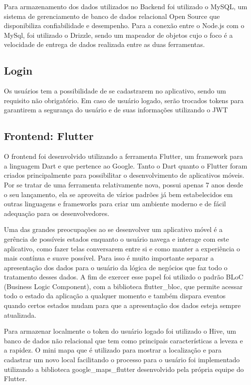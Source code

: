 \documentclass[12pt]{article}
\begin{document}
Para armazenamento dos dados utilizados no Backend foi utilizado o MySQL, um sistema de gerenciamento de banco de dados relacional Open Source que disponibiliza confiabilidade e desempenho. Para a conexão entre o Node.js com o MySql, foi utilizado o Drizzle, sendo um mapeador de objetos cujo o foco é a velocidade de entrega de dados realizada entre as duas ferramentas.

\subsection{Login}
Os usuários tem a possibilidade de se cadastrarem no aplicativo, sendo um requisito não obrigatório. Em caso de usuário logado, serão trocados tokens para garantirem a segurança do usuário e de suas informações utilizando o JWT

\subsection{Frontend: Flutter}
O frontend foi desenvolvido utilizando a ferramenta Flutter, um framework para a linguagem Dart e que pertence ao Google. Tanto o Dart quanto o Flutter foram criados principalmente para possibilitar o desenvolvimento de aplicativos móveis. Por se tratar de uma ferramenta relativamente nova, possui apenas 7 anos desde o seu lançamento, ela se aproveita de vários padrões já bem estabelecidos em outras linguagens e frameworks para criar um ambiente moderno e de fácil adequação para os desenvolvedores.

Uma das grandes preocupações ao se desenvolver um aplicativo móvel é a gerência de possíveis estados enquanto o usuário navega e interage com este aplicativo, como fazer telas conversarem entre si e como manter a experiência o mais contínua e suave possível. Para isso é muito importante separar a apresentação dos dados para o usuário da lógica de negócios que faz todo o tratamento desses dados. A fim de exercer esse papel foi utilizdo o padrão BLoC (Business Logic Component), com a biblioteca flutter\_bloc, que permite acessar todo o estado da aplicação a qualquer momento e também dispara eventos quando certos estados mudam para que a apresentação dos dados esteja sempre atualizada.

Para armazenar localmente o token do usuário logado foi utilizado o Hive, um banco de dados não relacional que tem como principais características a leveza e a rapidez. O mini mapa que é utilizado para mostrar a localização e para cadastrar um novo local facilitando o processo para o usuário foi implementado utilizando a biblioteca google\_maps\_flutter desenvolvido pela própria equipe do Flutter. 
\end{document}
